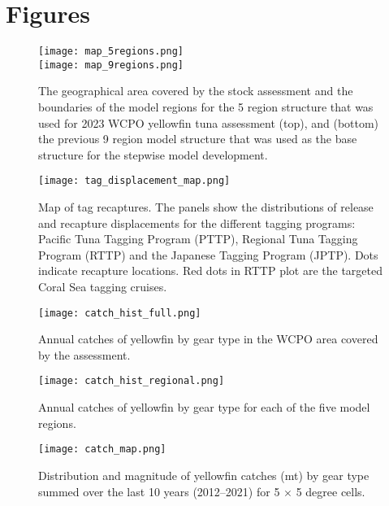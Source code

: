 
\section{Figures}

\begin{figure}[!ht]
  \centering
  \vspace{5mm}
  \texttt{[image: map\_5regions.png]}\\[12mm]
  \texttt{[image: map\_9regions.png]}\\[3mm]
  \caption{The geographical area covered by the stock assessment and the boundaries of the model regions for the 5 region structure that was used for 2023 WCPO yellowfin tuna assessment (top), and (bottom) the previous 9 region model structure that was used as the base structure for the stepwise model development.
    \label{fig:map_5regions_9regions}}
\end{figure}
\clearpage

\newpage
\begin{figure}[!ht]
  \centering
  \texttt{[image: tag\_displacement\_map.png]}
  \caption{Map of tag recaptures. The panels show the distributions of release and recapture displacements for the different tagging programs: Pacific Tuna Tagging Program (PTTP), Regional Tuna Tagging Program (RTTP) and the Japanese Tagging Program (JPTP). Dots indicate recapture locations. Red dots in RTTP plot are the targeted Coral Sea tagging cruises. \label{fig:tag_displacement_map}}
\end{figure}
\clearpage

\newpage
\begin{figure}[!ht]
  \centering
  \texttt{[image: catch\_hist\_full.png]}
  \caption{Annual catches of yellowfin by gear type in the WCPO area covered by the assessment. \label{fig:catch_hist_full}}
\end{figure}
\clearpage

\newpage
\begin{figure}[!ht]
  \centering
  \texttt{[image: catch\_hist\_regional.png]}
  \caption{Annual catches of yellowfin by gear type for each of the five model regions. \label{fig:catch_hist_regional}}
\end{figure}
\clearpage

\newpage
\begin{figure}[!ht]
  \centering
  \texttt{[image: catch\_map.png]}
  \caption{Distribution and magnitude of yellowfin catches (mt) by gear type summed over the last 10 years (2012--2021) for 5 $\times$ 5 degree cells. \label{fig:catch_map}}
\end{figure}
\clearpage

